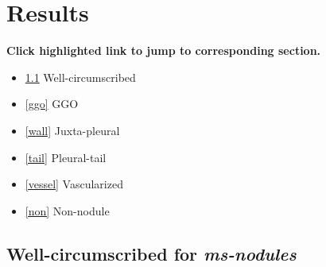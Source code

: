 \documentclass[onecolumn]{IEEEtran}
\begin{document}
\section{Results}
\textbf{Click highlighted link to jump to corresponding section.}
\begin{itemize}
\item \ref{iso} Well-circumscribed
\item \ref{ggo} GGO
\item \ref{wall} Juxta-pleural
\item \ref{tail} Pleural-tail
\item \ref{vessel} Vascularized
\item \ref{non} Non-nodule
\end{itemize}

\newpage
\subsection{Well-circumscribed for \emph{ms-nodules}}
\label{iso}
\end{document}
